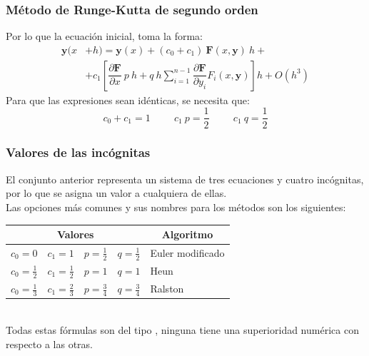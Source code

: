 \begin{frame}
\frametitle{Método de Runge-Kutta de segundo orden}
Por lo que la ecuación inicial, toma la forma:
\begin{align*}
\mathbf{y}(x &+ h) = \mathbf{y}(x) + (c_{0} + c_{1}) \: \mathbf{F}(x,\mathbf{y}) \: h + \\
&+ c_{1} \left[ \dfrac{\partial \mathbf{F}}{\partial x} \: p \: h + q \: h \sum_{i=1}^{n - 1} \dfrac{\partial \mathbf{F}}{\partial y_{i}} F_{i}(x,\mathbf{y}) \right] h + O(h^{3}) 
\end{align*}
Para que las expresiones sean idénticas, se necesita que:
\[ c_{0} + c_{1} = 1 \hspace{1cm} c_{1} \: p = \dfrac{1}{2} \hspace{1cm} c_{1} \: q = \dfrac{1}{2}\]
\end{frame}
\begin{frame}
\frametitle{Valores de las incógnitas}
El conjunto anterior representa un sistema de tres ecuaciones y cuatro incógnitas, por lo que se asigna un valor a cualquiera de ellas.
\\
\medskip
Las opciones más comunes y sus nombres para los métodos son los siguientes:
\end{frame}
\begin{frame}
\begin{tabular}{| l | l | l | l | l |}
\hline
\multicolumn{4}{|c|}{Valores} & \multicolumn{1}{|c|}{Algoritmo} \\ \hline
$c_{0}= 0$ & $c_{1} = 1$ & $p = \frac{1}{2}$ & $q = \frac{1}{2}$ & Euler modificado \\ \hline
$c_{0} = \frac{1}{2}$ & $c_{1} = \frac{1}{2}$ & $p = 1$ & $q = 1$ & Heun \\ \hline
$c_{0} = \frac{1}{3}$ & $c_{1} = \frac{2}{3}$ & $p = \frac{3}{4}$ & $q = \frac{3}{4}$ & Ralston \\ \hline
\end{tabular}
\\
\medskip
Todas estas fórmulas son del tipo , ninguna tiene una superioridad numérica con respecto a las otras.
\end{frame}
